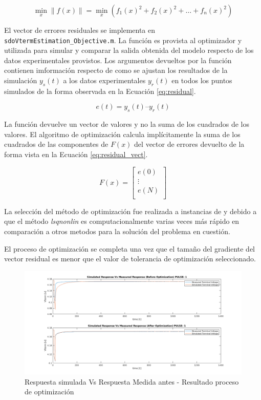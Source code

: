 \documentclass[10pt, a4paper]{report}
\begin{document}
\begin{equation}
    \min_{x}\|f(x)\| = \min_{x} (f_1(x)^2 + f_2(x)^2+\dots+f_n(x)^2)
\end{equation}

El vector de errores residuales se implementa en
\texttt{sdoVtermEstimation\_Objective.m}. La función es provista al optimizador y
utilizada para simular y comparar la salida obtenida del modelo respecto de los
datos experimentales provistos. Los argumentos devueltos por la función
contienen imformación respecto de como se ajustan los resultados de la
simulación $y_{s}(t)$ a los datos experimentales $y_{r}(t)$ en todos los puntos
simulados de la forma observada en la Ecuación \ref{eq:residual}.

\begin{equation}
    e(t) = y_{s}(t)–y_{r}(t) 
    \label{eq:residual}
\end{equation}

La función devuelve un vector de valores y no la suma de los cuadrados de los
valores. El algoritmo de optimización calcula implícitamente la suma de los
cuadrados de las componentes de $F(x)$ del vector de errores devuelto de la
forma vista en la Ecuación \ref{eq:residual_vect}.

\begin{equation}
    F(x) = \begin{bmatrix}
        e(0)\\
        \vdots\\
        e(N)\\
    \end{bmatrix}
    \label{eq:residual_vect}
\end{equation}

La selección del método de optimización fue realizada a instancias de
\cite{Jackey2013BatteryMP} y debido a que el método \emph{lsqnonlin} es
computacionalmente varias veces más rápido en comparación a otros metodos para
la solución del problema en cuestión.

El proceso de optimización se completa una vez que el tamaño del gradiente del
vector residual es menor que el valor de tolerancia de optimización
seleccionado.

\begin{figure}[h!]
	\begin{center}
		\includegraphics[width=1\textwidth]{sim_vs_measured_response.png}
		\caption{Respuesta simulada Vs Respuesta Medida antes - Resultado
        proceso de optimización}
		\label{fig:sim_vs_mea_resp}
	\end{center}
\end{figure}
\end{document}

